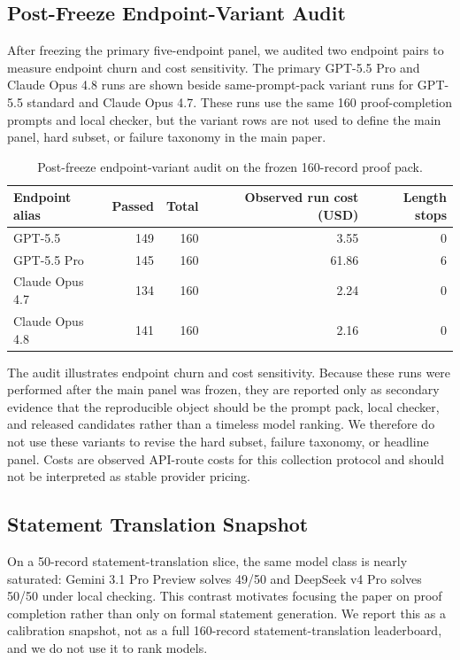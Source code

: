 \subsection{Post-Freeze Endpoint-Variant Audit}

After freezing the primary five-endpoint panel, we audited two endpoint pairs to
measure endpoint churn and cost sensitivity. The primary GPT-5.5 Pro and
Claude Opus 4.8 runs are shown beside same-prompt-pack variant runs for
GPT-5.5 standard and Claude Opus 4.7. These runs use the same 160
proof-completion prompts and local checker, but the variant rows are not used
to define the main panel, hard subset, or failure taxonomy in the main paper.

\begin{table}[htbp]
\centering
\caption{Post-freeze endpoint-variant audit on the frozen 160-record proof pack.}
\label{tab:supp-model-variant-audit}
\small
\begin{tabular}{lrrrr}
\toprule
Endpoint alias & Passed & Total & Observed run cost (USD) & Length stops\\
\midrule
GPT-5.5 & 149 & 160 & 3.55 & 0\\
GPT-5.5 Pro & 145 & 160 & 61.86 & 6\\
Claude Opus 4.7 & 134 & 160 & 2.24 & 0\\
Claude Opus 4.8 & 141 & 160 & 2.16 & 0\\
\bottomrule
\end{tabular}
\end{table}

The audit illustrates endpoint churn and cost sensitivity. Because these runs
were performed after the main panel was frozen, they are reported only as
secondary evidence that the reproducible object should be the prompt pack,
local checker, and released candidates rather than a timeless model ranking.
We therefore do not use these variants to revise the hard subset, failure
taxonomy, or headline panel. Costs are observed API-route costs for this
collection protocol and should not be interpreted as stable provider pricing.

\subsection{Statement Translation Snapshot}

On a 50-record statement-translation slice, the same model class is nearly
saturated: Gemini 3.1 Pro Preview solves 49/50 and DeepSeek v4 Pro solves
50/50 under local checking. This contrast motivates focusing the paper on
proof completion rather than only on formal statement generation. We report
this as a calibration snapshot, not as a full 160-record statement-translation
leaderboard, and we do not use it to rank models.

